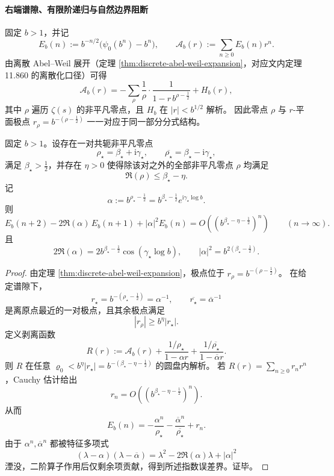 \paragraph{右端谱隙、有限阶递归与自然边界阻断}\label{par:xi-discrete-abel-weil-right-edge-gap-recursion-natural-boundary}
固定 \(b>1\)，并记
\[
E_b(n):=b^{-n/2}\bigl(\psi_0(b^n)-b^n\bigr),\qquad
\mathcal A_b(r):=\sum_{n\ge 0}E_b(n)r^n.
\]
由离散 Abel--Weil 展开（定理 \ref{thm:discrete-abel-weil-expansion}，对应文内定理 11.860 的离散化口径）可得
\[
\mathcal A_b(r)
=-\sum_{\rho}\frac{1}{\rho}\cdot\frac{1}{1-r\,b^{\rho-\frac12}}+H_b(r),
\]
其中 \(\rho\) 遍历 \(\zeta(s)\) 的非平凡零点，且 \(H_b\) 在 \(|r|<b^{1/2}\) 解析。
因此零点 \(\rho\) 与 \(r\)-平面极点
\(
r_\rho=b^{-(\rho-\frac12)}
\)
一一对应于同一部分分式结构。

\begin{theorem}[右端谱隙诱导的二阶递归与指数误差界]\label{thm:xi-abel-rightedge-gap-ar2-exp-error}
固定 \(b>1\)。设存在一对共轭非平凡零点
\[
\rho_\star=\beta_\star+\mathrm{i}\gamma_\star,\qquad
\overline{\rho_\star}=\beta_\star-\mathrm{i}\gamma_\star,
\]
满足 \(\beta_\star>\frac12\)，并存在 \(\eta>0\) 使得除该对之外的全部非平凡零点 \(\rho\) 均满足
\[
\Re(\rho)\le \beta_\star-\eta.
\]
记
\[
\alpha:=b^{\rho_\star-\frac12}
=b^{\beta_\star-\frac12}e^{\mathrm{i}\gamma_\star\log b}.
\]
则
\[
E_b(n+2)-2\Re(\alpha)\,E_b(n+1)+|\alpha|^2E_b(n)
=O\!\left(\left(b^{\beta_\star-\eta-\frac12}\right)^n\right)
\qquad(n\to\infty).
\]
且
\[
2\Re(\alpha)=2b^{\beta_\star-\frac12}\cos(\gamma_\star\log b),\qquad
|\alpha|^2=b^{2(\beta_\star-\frac12)}.
\]
\end{theorem}
\begin{proof}
由定理 \ref{thm:discrete-abel-weil-expansion}，极点位于 \(r_\rho=b^{-(\rho-\frac12)}\)。
在给定谱隙下，
\[
r_\star=b^{-(\rho_\star-\frac12)}=\alpha^{-1},\qquad
\overline{r_\star}=\overline{\alpha}^{-1}
\]
是离原点最近的一对极点，且其余极点满足
\[
|r_\rho|\ge b^\eta|r_\star|.
\]
定义剥离函数
\[
R(r):=\mathcal A_b(r)+\frac{1/\rho_\star}{1-\alpha r}
+\frac{1/\overline{\rho_\star}}{1-\overline{\alpha}r}.
\]
则 \(R\) 在任意 \(\varrho_0<b^\eta|r_\star|=b^{-(\beta_\star-\eta-\frac12)}\) 的圆盘内解析。
若 \(R(r)=\sum_{n\ge 0}r_n r^n\)，Cauchy 估计给出
\[
r_n=O\!\left(\left(b^{\beta_\star-\eta-\frac12}\right)^n\right).
\]
从而
\[
E_b(n)=-\frac{\alpha^n}{\rho_\star}-\frac{\overline{\alpha}^n}{\overline{\rho_\star}}+r_n.
\]
由于 \(\alpha^n,\overline{\alpha}^n\) 都被特征多项式
\[
(\lambda-\alpha)(\lambda-\overline{\alpha})
=\lambda^2-2\Re(\alpha)\lambda+|\alpha|^2
\]
湮没，二阶算子作用后仅剩余项贡献，得到所述指数误差界。证毕。
\end{proof}

